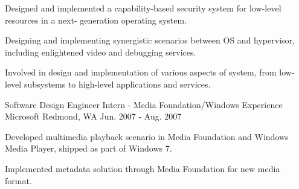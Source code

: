 \begin{cventries}
{\begin{cvitems}
        \item {Designed and implemented a capability-based security system for low-level resources in a next- generation operating system.}
        \item {Designing and implementing synergistic scenarios between OS and hypervisor, including enlightened video and debugging services.}
        \item {Involved in design and implementation of various aspects of system, from low-level subsystems to high-level applications and services.}
      \end{cvitems} 
    }
  \cventry
    {Software Design Engineer Intern - Media Foundation/Windows Experience}
    {Microsoft}
    {Redmond, WA}
    {Jun. 2007 - Aug. 2007}
    {
      \begin{cvitems}
        \item {Developed multimedia playback scenario in Media Foundation and Windows Media Player, shipped as part of Windows 7.}
        \item {Implemented metadata solution through Media Foundation for new media format. }
      \end{cvitems}
    }
\end{cventries}
